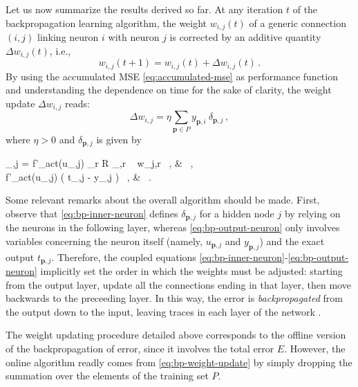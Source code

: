 \documentclass[12pt, a4paper, twoside, openright, notitlepage]{report}
\numberwithin{equation}{chapter}
\theoremstyle{theorem}
\theoremstyle{definition}
\theoremstyle{remark}
\theoremstyle{proposition}
\numberwithin{figure}{chapter}
\begin{document}
		Let us now summarize the results derived so far. At any iteration $t$ of the backpropagation learning algorithm, the weight $w_{i,j}(t)$ of a generic connection $(i,j)$ linking neuron $i$ with neuron $j$ is corrected by an additive quantity $\Delta w_{i,j}(t)$, i.e., 
		\begin{equation*}
			w_{i,j}(t+1) = w_{i,j}(t) + \Delta w_{i,j}(t) \, .
		\end{equation*}
		By using the accumulated MSE \eqref{eq:accumulated-mse} as performance function and understanding the dependence on time for the sake of clarity, the weight update $\Delta w_{i,j}$ reads:
		\begin{equation*}
			\Delta w_{i,j} = \eta \sum_{\mathbf{p} \in P} y_{\mathbf{p},i} ~ \delta_{\mathbf{p},j} \, ,
		\end{equation*}
		where $\eta > 0$ and $\delta_{\mathbf{p},j}$ is given by
		\begin{subnumcases}{\delta_{,j} =}
			\label{eq:bp-inner-neuron}
		   	f'_{act}(u_{,j}) \sum_{r \in R} \delta_{,r} ~ w_{j,r} \, , &  \, , \\
		   	\label{eq:bp-output-neuron}
			 f'_{act}(u_{,j}) \left( t_{,j} - y_{,j} \right) \, , &  \, .
		\end{subnumcases}
		Some relevant remarks about the overall algorithm should be made. First, observe that \eqref{eq:bp-inner-neuron} defines $\delta_{\mathbf{p},j}$ for a hidden node $j$ by relying on the neurons in the following layer, whereas \eqref{eq:bp-output-neuron} only involves variables concerning the neuron itself (namely, $u_{\mathbf{p},j}$ and $y_{\mathbf{p},j}$) and the exact output $t_{\mathbf{p},j}$. Therefore, the coupled equations \eqref{eq:bp-inner-neuron}-\eqref{eq:bp-output-neuron} implicitly set the order in which the weights must be adjusted: starting from the output layer, update all the connections ending in that layer, then move backwards to the preceeding layer. In this way, the error is \emph{backpropagated} from the output down to the input, leaving traces in each layer of the network \cite{Kri07, WH60}.
		
		The weight updating procedure detailed above corresponds to the offline version of the backpropagation of error, since it involves the total error $E$. However, the online algorithm readly comes from \eqref{eq:bp-weight-update} by simply dropping the summation over the elements of the training set $P$.
		
\end{document}
